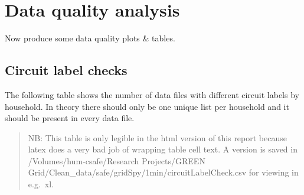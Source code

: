\documentclass[]{article}
\begin{document}
\section{Data quality analysis}\label{data-quality-analysis}

Now produce some data quality plots \& tables.

\subsection{Circuit label checks}\label{circuit-label-checks}

The following table shows the number of data files with different
circuit labels by household. In theory there should only be one unique
list per household and it should be present in every data file.

\begin{quote}
NB: This table is only legible in the html version of this report
because latex does a very bad job of wrapping table cell text. A version
is saved in /Volumes/hum-csafe/Research Projects/GREEN
Grid/Clean\_data/safe/gridSpy/1min/circuitLabelCheck.csv for viewing in
e.g.~xl.
\end{quote}
\end{document}
